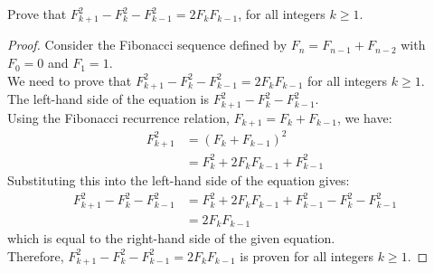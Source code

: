\documentclass[name=Ojas\ Chaturvedi, emailid=oj.chaturvedi.2024, course=Capstone:\ Discrete\ Math, num=9, deadline={November\ 17,\ 2023}]{homework}
\begin{document}
    Prove that $F_{k+1}^2 - F_k^2 - F_{k-1}^2 = 2F_k F_{k-1}$, for all integers $k \geq 1$.
\begin{proof}
    Consider the Fibonacci sequence defined by $F_n = F_{n-1} + F_{n-2}$ with $F_0 = 0$ and $F_1 = 1$. \\
    We need to prove that $F_{k+1}^2 - F_k^2 - F_{k-1}^2 = 2F_k F_{k-1}$ for all integers $k \geq 1$. \\
    The left-hand side of the equation is $F_{k+1}^2 - F_k^2 - F_{k-1}^2$. \\
    Using the Fibonacci recurrence relation, $F_{k+1} = F_k + F_{k-1}$, we have:
    \begin{align*}
    F_{k+1}^2 &= (F_k + F_{k-1})^2 \\
              &= F_k^2 + 2F_k F_{k-1} + F_{k-1}^2
    \end{align*}
    Substituting this into the left-hand side of the equation gives:
    \begin{align*}
    F_{k+1}^2 - F_k^2 - F_{k-1}^2 &= F_k^2 + 2F_k F_{k-1} + F_{k-1}^2 - F_k^2 - F_{k-1}^2 \\
    &= 2F_k F_{k-1}
    \end{align*}
    which is equal to the right-hand side of the given equation. \\
    Therefore, $F_{k+1}^2 - F_k^2 - F_{k-1}^2 = 2F_k F_{k-1}$ is proven for all integers $k \geq 1$.
\end{proof}
\end{document}
